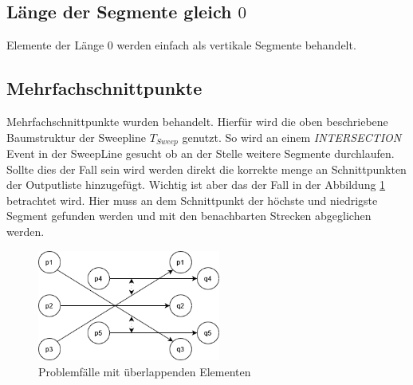 \documentclass[conference]{IEEEtran}
\begin{document}
	\subsection{Länge der Segmente gleich $0$}
	Elemente der Länge 0 werden einfach als vertikale Segmente behandelt.
	
	\subsection{Mehrfachschnittpunkte}
	Mehrfachschnittpunkte wurden behandelt. Hierfür wird die oben beschriebene Baumstruktur der Sweepline $T_{Sweep}$ genutzt. So wird an einem \textit{INTERSECTION} Event in der SweepLine gesucht ob an der Stelle weitere Segmente durchlaufen. Sollte dies der Fall sein wird werden direkt die korrekte menge an Schnittpunkten der Outputliste hinzugefügt. Wichtig ist aber das der Fall in der Abbildung \ref{Multi} betrachtet wird. Hier muss an dem Schnittpunkt der höchste und niedrigste Segment gefunden werden und mit den benachbarten Strecken abgeglichen werden.
	\begin{figure}[h]
		\begin{center}
			\includegraphics[width=6cm]{MultiSchnitt.png}
			\caption{Problemfälle mit überlappenden Elementen}
			\label{Multi}
		\end{center}
	\end{figure}
	
\end{document}
